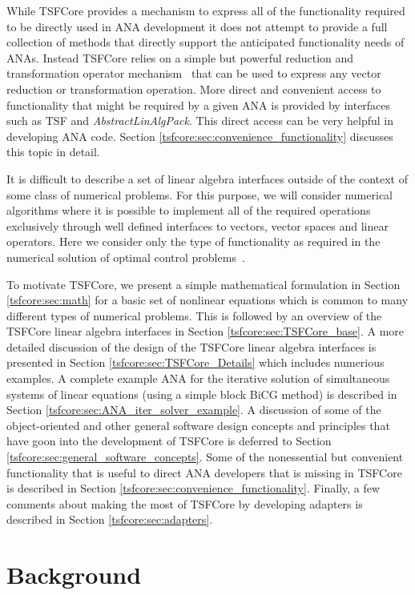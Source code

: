 \documentclass[10pt,fleqn]{article}
\begin{document}
While TSFCore provides a mechanism to express 
all of the functionality required to be directly used in ANA
development it does not attempt to provide a full collection of 
methods that directly support the anticipated functionality
needs of ANAs.  Instead TSFCore relies on a simple but powerful 
reduction and transformation operator mechanism~\cite{ref:rtop_toms}
that can be used to express any vector reduction or transformation 
operation.  More direct and convenient access to functionality that might be 
required by a given ANA is 
provided by interfaces such as TSF and \textit{AbstractLinAlgPack}. 
This direct access can be very helpful in developing ANA code.
Section \ref{tsfcore:sec:convenience_functionality} discusses this topic
in detail.

It is difficult to describe a set of linear algebra interfaces outside
of the context of some class of numerical problems.  For this purpose,
we will consider numerical algorithms where it is possible to implement
all of the required operations exclusively through well defined interfaces
to vectors, vector spaces and linear operators.  Here we consider
only the type of functionality as required in the numerical solution
of optimal control problems~\cite{ref:opt_ctrl_itfc}.

To motivate TSFCore, we present a simple mathematical formulation in
Section \ref{tsfcore:sec:math} for a basic set of nonlinear equations
which is common to many different types of numerical problems.  This
is followed by an overview of the TSFCore linear algebra interfaces in
Section \ref{tsfcore:sec:TSFCore_base}.  A more detailed discussion of
the design of the TSFCore linear algebra interfaces is presented in
Section \ref{tsfcore:sec:TSFCore_Details} which includes numerious
examples.  A complete example ANA for the iterative solution of
simultaneous systems of linear equations (using a simple block BiCG
method) is described in Section
\ref{tsfcore:sec:ANA_iter_solver_example}.  A discussion of some of the
object-oriented and other general software design concepts and
principles that have goon into the development of TSFCore is deferred
to Section \ref{tsfcore:sec:general_software_concepts}.  Some of the
nonessential but convenient functionality that is useful to direct ANA
developers that is missing in TSFCore is described in Section
\ref{tsfcore:sec:convenience_functionality}. Finally, a few comments
about making the most of TSFCore by developing adapters is described in
Section \ref{tsfcore:sec:adapters}.

%
\section{Background}
\label{tsfcore:sec:background}
%
\end{document}
